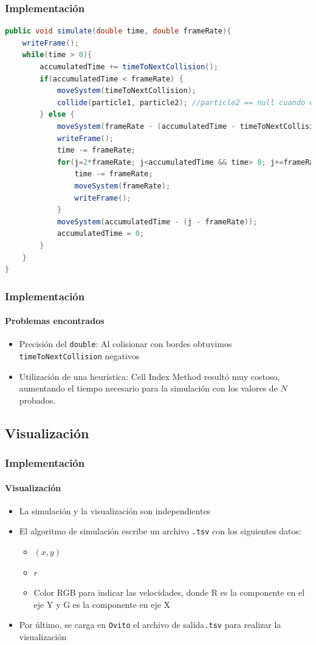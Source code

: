 \documentclass[hyperref={pdfpagelayout=SinglePage}]{beamer}
\begin{document}
\begin{frame}[fragile]
\frametitle{Implementación}
\begin{lstlisting}[language=Java, caption = Algoritmo de simulación del sistema.]
public void simulate(double time, double frameRate){
	writeFrame();
	while(time > 0){
		accumulatedTime += timeToNextCollision();
		if(accumulatedTime < frameRate) {
			moveSystem(timeToNextCollision);
			collide(particle1, particle2); //particle2 == null cuando es borde
		} else {
			moveSystem(frameRate - (accumulatedTime - timeToNextCollision));
			writeFrame();
			time -= frameRate;
			for(j=2*frameRate; j<accumulatedTime && time> 0; j+=frameRate) {
				time -= frameRate;
				moveSystem(frameRate);
				writeFrame();
			}
			moveSystem(accumulatedTime - (j - frameRate));
			accumulatedTime = 0;
		}
	}
}
\end{lstlisting}
\end{frame}

\begin{frame}
\frametitle{Implementación}
\framesubtitle{Problemas encontrados}
\begin{itemize}
\item Precisión del \texttt{double}: Al colisionar con bordes obtuvimos \texttt{timeToNextCollision} negativos
\item Utilización de una heurística: Cell Index Method resultó muy costoso, aumentando el tiempo necesario para la simulación con los valores de $N$ probados.
\end{itemize}
\end{frame}

\subsection{Visualización}

\begin{frame}
\frametitle{Implementación}
\framesubtitle{Visualización}
\begin{itemize}
	\item La simulación y la visualización son independientes
	\item El algoritmo de simulación escribe un archivo \texttt{.tsv} con los siguientes datos:
\begin{itemize}
\item $(x,y)$
\item $r$
\item Color RGB para indicar las velocidades, donde R es la componente en el eje Y y G es la componente en eje X
\end{itemize}
\item Por último, se carga en \texttt{Ovito} el archivo de salida\texttt{.tsv} para realizar la visualización
\end{itemize}
\end{frame}
\end{document}
